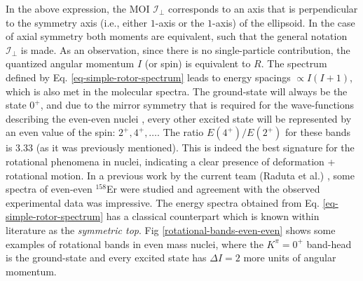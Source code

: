 In the above expression, the MOI $\mathcal{I}_\perp$ corresponds to an axis that is perpendicular to the symmetry axis (i.e., either $1$-axis or the $1$-axis) of the ellipsoid. In the case of axial symmetry both moments are equivalent, such that the general notation $\mathcal{I}_\perp$ is made. As an observation, since there is no single-particle contribution, the quantized angular momentum $I$ (or spin) is equivalent to $R$. The spectrum defined by Eq. \ref{eq-simple-rotor-spectrum} leads to energy spacings $\propto I(I+1)$, which is also met in the  molecular spectra. The ground-state will always be the state $0^+$, and due to the mirror symmetry that is required for the wave-functions describing the even-even nuclei \cite{ring2004nuclear}, every other excited state will be represented by an even value of the spin: $2^+,4^+,\dots$.
The ratio $E(4^+)/E(2^+)$ for these bands is $3.33$ (as it was previously mentioned). This is indeed the best signature for the rotational phenomena in nuclei, indicating a clear presence of deformation + rotational motion. In a previous work by the current team (Raduta et al.) \cite{raduta2017semiclassical}, some spectra of even-even $^{158}$Er were studied and agreement with the observed experimental data was impressive. The energy spectra obtained from Eq. \ref{eq-simple-rotor-spectrum} has a classical counterpart which is known within literature as the \emph{symmetric top}. Fig \ref{rotational-bands-even-even} shows some examples of rotational bands in even mass nuclei, where the $K^{\pi}=0^+$ band-head is the ground-state and every excited state has $\Delta I=2$ more units of angular momentum.

